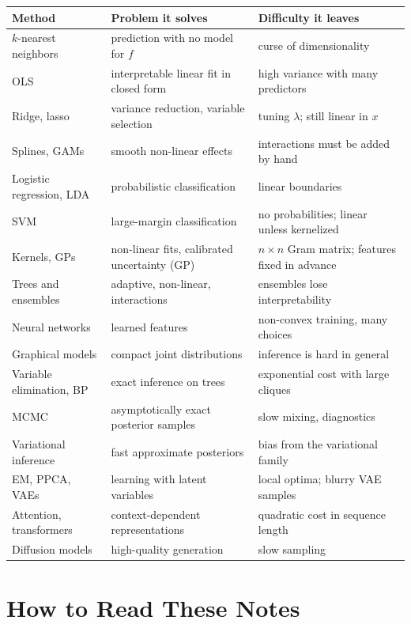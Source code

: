 \begin{center}
\small
\begin{tabularx}{\textwidth}{@{}l>{\raggedright\arraybackslash}X>{\raggedright\arraybackslash}X@{}}
\toprule
Method & Problem it solves & Difficulty it leaves \\
\midrule
$k$-nearest neighbors & prediction with no model for $f$ & curse of dimensionality \\
OLS & interpretable linear fit in closed form & high variance with many predictors \\
Ridge, lasso & variance reduction, variable selection & tuning $\lambda$; still linear in $x$ \\
Splines, GAMs & smooth non-linear effects & interactions must be added by hand \\
Logistic regression, LDA & probabilistic classification & linear boundaries \\
SVM & large-margin classification & no probabilities; linear unless kernelized \\
Kernels, GPs & non-linear fits, calibrated uncertainty (GP) & $n\times n$ Gram matrix; features fixed in advance \\
Trees and ensembles & adaptive, non-linear, interactions & ensembles lose interpretability \\
Neural networks & learned features & non-convex training, many choices \\
Graphical models & compact joint distributions & inference is hard in general \\
Variable elimination, BP & exact inference on trees & exponential cost with large cliques \\
MCMC & asymptotically exact posterior samples & slow mixing, diagnostics \\
Variational inference & fast approximate posteriors & bias from the variational family \\
EM, PPCA, VAEs & learning with latent variables & local optima; blurry VAE samples \\
Attention, transformers & context-dependent representations & quadratic cost in sequence length \\
Diffusion models & high-quality generation & slow sampling \\
\bottomrule
\end{tabularx}
\end{center}

\section*{How to Read These Notes}

